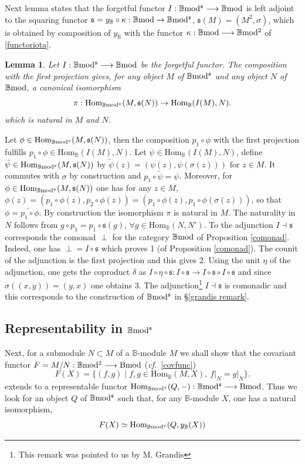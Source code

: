 \documentclass[12pt]{article}
\newtheorem{lem}[thm]{Lemma}
\def\Hom{{\rm Hom}}
\def\B{{\mathbb B}}
\newcommand{\cf}{{\it cf.}}
\def\Hom {{\mbox{Hom}}}
\def\yb{\mathfrak{s}}
\def\bmod{{\rm \B mod}}
\def\bm2{{\rm \B mod^2}}
\def\b2{{\rm \B mod^{\mathfrak s}}}
\begin{document}
Next lemma states that the forgetful functor $I:\b2\longrightarrow \bmod$ is left adjoint to the squaring functor  $\yb=y_\B\circ \kappa:\bmod\to\b2$,  $\yb(M)=(M^2,\sigma)$, which is obtained by composition of $y_\B$ with the functor $\kappa:\bmod\longrightarrow \bm2$ of \eqref{functoriota}.
\begin{lem}\label{forgetful}Let $I:\b2\longrightarrow \bmod$ be the forgetful functor. The composition with the first projection gives, for any object $M$ of $\b2$ and any object $N$ of $\bmod$, a canonical isomorphism
\begin{equation}	
\label{canonicaliso}
\pi:\Hom_\b2(M,\yb(N))\to \Hom_\B(I(M),N).
\end{equation}
which is natural in $M$ and $N$.  \end{lem}
  \proof Let $\phi\in \Hom_\b2(M,\yb(N))$, then the composition $p_1\circ \phi$  with the first projection fulfills  
$p_1\circ \phi\in \Hom_\B(I(M),N)$. Let $\psi\in \Hom_\B(I(M),N)$, define $
\tilde \psi \in \Hom_\b2(M,\yb(N))$ by $\tilde \psi(z)=(\psi(z),\psi(\sigma(z)))$ for $z\in M$. It commutes with $\sigma$ by construction and $p_1\circ\tilde \psi=\psi$. Moreover, for $\phi\in \Hom_\b2(M,\yb(N))$ one has for any $z\in M$, 
$
\phi(z)=(p_1\circ \phi(z),p_2\circ \phi(z))=(p_1\circ \phi(z),p_1\circ \phi(\sigma(z)))
$, 
so that $\phi=\widetilde{p_1\circ \phi}$. By construction the isomorphism $\pi$ is natural in $M$. The naturality in $N$ follows from $g\circ p_1=p_1\circ \yb(g)$, $\forall g\in \Hom_\B(N,N')$. \endproof 
To the adjunction $I\dashv \yb$ corresponds the  comonad  $\perp$ for the category $\bmod$ of Proposition \ref{comonad}. Indeed, one has $\perp=I\circ \yb$ which proves 1 (of Proposition \ref{comonad}). The counit of the adjunction is the first projection and this gives 2. Using the unit $\eta$ of the adjunction, one gets the coproduct $\delta$ as $I\circ \eta\circ \yb:I\circ \yb\longrightarrow I\circ \yb\circ I\circ \yb$ and since $\sigma((x,y))=(y,x)$ one obtains 3. The adjunction\footnote{This remark was pointed to us by M. Grandis} $I\dashv \yb$  is comonadic and this corresponds to the construction of $\b2$ in \S \ref{grandis remark}.
  
  \subsection{Representability in $\b2$}\label{sect yoneda1}
  
   Next, for a submodule $N\subset M$ of a $\B$-module $M$ we shall show that the   covariant functor $F=M/N:\bm2\longrightarrow {\rm Bmod}$ (\cf~\eqref{covfunc})
\begin{equation}	
\label{cohomseqter1}
F(X)=\{(f,g)\mid f,g\in \Hom_\B(M,X),\ f\vert_N=g\vert_N\}.
\end{equation}
extends to a representable functor $\Hom_\b2(Q,-):\b2\longrightarrow {\rm Bmod}$. Thus we look for an object $Q$ of $\b2$ such that, for any $\B$-module $X$, one has a natural isomorphism,  
\begin{equation}	
\label{cohomseqter1bis}
F(X) \simeq \Hom_\b2(Q,y_\B(X))
\end{equation}
\end{document}
